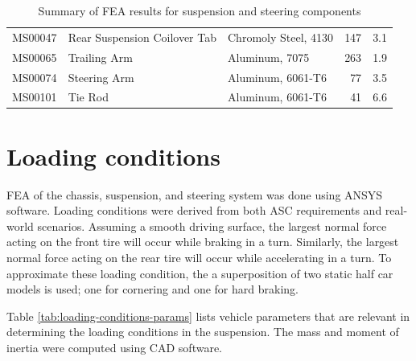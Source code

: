 \documentclass[10pt]{article}
\begin{document}
\begin{table}
\begin{tabular}{lllrr}
MS00047     & Rear Suspension Coilover Tab & Chromoly Steel, 4130 &                 147 &           3.1 \\
MS00065     & Trailing Arm                 & Aluminum, 7075       &                 263 &           1.9 \\
MS00074     & Steering Arm                 & Aluminum, 6061-T6    &                  77 &           3.5 \\
MS00101     & Tie Rod                      & Aluminum, 6061-T6    &                  41 &           6.6 \\
\bottomrule
\end{tabular}
\caption{Summary of FEA results for suspension and steering components}
\label{tab:fea-results-suspension-steering}
\end{table}


\clearpage
\appendix
\section{Loading conditions}
\label{sec:loading-conditions}
FEA of the chassis, suspension, and steering system was done using ANSYS software. Loading conditions were derived from both ASC requirements and real-world scenarios. Assuming a smooth driving surface, the largest normal force acting on the front tire will occur while braking in a turn. Similarly, the largest normal force acting on the rear tire will occur while accelerating in a turn. To approximate these loading condition, the a superposition of two static half car models is used; one for cornering and one for hard braking.

Table \ref{tab:loading-conditions-params} lists vehicle parameters that are relevant in determining the loading conditions in the suspension. The mass and moment of inertia were computed using CAD software. 
\end{document}
